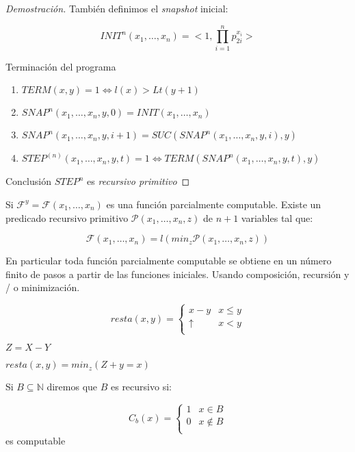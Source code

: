 \begin{proof}[Demostraci\'on]
Tambi\'en definimos el \textit{snapshot} inicial:
 
\[
INIT^{n}(x_1, \ldots, x_n) = <1, \prod_{i = 1}^{n} p_{2i}^{x_i}>
\]
 
Terminaci\'on del programa
 
\begin{enumerate}
	\item $TERM(x, y) = 1 \iff l(x) > Lt(y + 1) $
	\item $SNAP^n(x_1, \ldots, x_n, y, 0) = INIT(x_1, \ldots, x_n)$
	\item $SNAP^n(x_1, \ldots, x_n, y, i + 1) = SUC(SNAP^{n}(x_1, \ldots, x_n, y , i), y)$
	\item $STEP^{(n)}(x_1, \ldots, x_n, y, t) = 1 \iff TERM(SNAP^{n}(x_1, \ldots, x_n, y, t), y)$
\end{enumerate}
 
Conclusi\'on $STEP^{n}$ es \textit{recursivo primitivo}
 
\end{proof}
 
\begin{colorario}
Si $\mathcal{F}^y = \mathcal{F}(x_1, \ldots, x_n)$ es una funci\'on parcialmente computable. Existe un predicado recursivo primitivo $\mathcal{P}(x_1, \ldots, x_n, z)$ de $n + 1$ variables tal que:
 
\[
\mathcal{F}(x_1, \ldots, x_n) = l(min_{z}\mathcal{P}(x_1, \ldots, x_n, z))
\]
\end{colorario}
 
En particular toda funci\'on parcialmente computable se obtiene en un n\'umero finito de pasos a partir de las funciones iniciales.  Usando composici\'on, recursi\'on y / o minimizaci\'on.
 
\begin{example}
\[
resta(x, y) =
\begin{cases}
x - y			&x \leq y			\\
\uparrow		&x < y				\\
\end{cases}
\]
 
$Z = X - Y$
 
$resta(x, y) = min_{z}(Z + y = x )$
\end{example}
 
\begin{definition}
Si $B \subseteq \mathbb{N}$ diremos que $B$ es recursivo si:
 
\[
C_{b}(x) =
\begin{cases}
1		&x \in  B		\\
0		&x \not \in B		\\
\end{cases}
\]
es computable
\end{definition}
 

